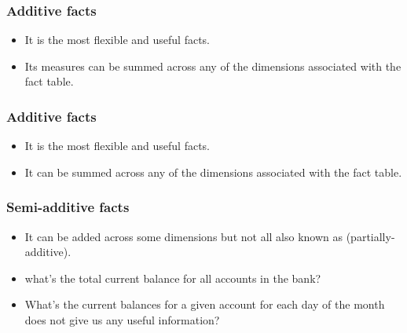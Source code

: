 \begin{frame}
    \frametitle{Additive facts}
                \begin{itemize}
                    \item It is the most ﬂexible and useful facts.
                    \item Its measures can be summed across any of the dimensions associated with the fact table.
                \end{itemize}

\end{frame}

\begin{frame}
    \frametitle{Additive facts}
                \begin{itemize}
                    \item It is the most ﬂexible and useful facts.
                    \item It can be summed across any of the dimensions associated with the fact table.
                \end{itemize}    
                \vspace{1cm}
                \centering
                

\end{frame}
\begin{frame}
    \frametitle{Semi-additive facts}
    
    \begin{itemize}
        \item It can be added across some dimensions but not all also known as (partially-additive).
    \end{itemize}
    \vspace{1cm}
    \centering
    
    \begin{itemize}
        \item what's the total current balance for all accounts in the bank?
        \item What's the current balances for a given account for each day of the month does not give us any useful information?
    \end{itemize}
    
\end{frame}
